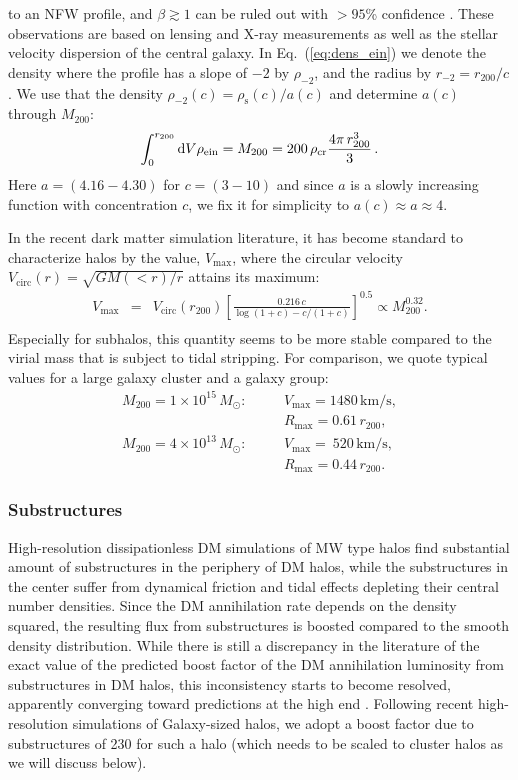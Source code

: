\documentclass[10pt,aps,pra,reprint,amsmath,amsfonts,amssymb,showpacs,nofootinbib,floatfix]{revtex4-1}
\newcommand{\rmn}{\mathrm}
\newcommand{\msun}{M_\odot}
\newcommand{\s}{\rmn{s}}
\newcommand{\dd}{\rmn{d}}
\newcommand{\rvir}{r_{200}}
\newcommand{\mvir}{M_{200}}
\begin{document}
to an NFW profile, and $\beta\gtrsim 1$ can be ruled out with $>95$\%
confidence \cite{2011ApJ...728L..39N}. These observations are based on
lensing and X-ray measurements as well as the stellar velocity
dispersion of the central galaxy. In Eq.~(\ref{eq:dens_ein}) we denote
the density where the profile has a slope of $-2$ by $\rho_{-2}$, and
the radius by $r_{-2}=\rvir/c$. We use that the density
$\rho_{-2}(c)=\rho_\s(c)/a(c)$ and determine $a(c)$ through $\mvir$:
\begin{equation}
\int_0^{\rvir}\dd V \rho_{\rm ein} = \mvir =
200\,\rho_{\rmn{cr}} \frac{4\pi\,\rvir^3}{3} \,.
\end{equation}
Here $a=(4.16-4.30)$ for $c=(3-10)$ and since $a$ is a slowly
increasing function with concentration $c$, we fix it for simplicity
to $a(c)\approx a \approx 4$.

In the recent dark matter simulation literature, it has become
standard to characterize halos by the value, $V_\rmn{max}$, where the
circular velocity $V_\rmn{circ}(r)=\sqrt{GM(<r)/r}$ attains its
maximum:
\begin{eqnarray}
V_\rmn{max} &=& V_\rmn{circ}(\rvir)
\left[\frac{0.216\,c}{\log(1+c)-c/(1+c)}\right]^{0.5}\propto \mvir^{0.32}.\nonumber\\
\end{eqnarray}
Especially for subhalos, this quantity seems to be more stable
compared to the virial mass that is subject to tidal stripping. For
comparison, we quote typical values for a large galaxy cluster and a galaxy group:
\begin{eqnarray}
M_{200} = 1\times10^{15}\,\msun:\quad &&V_\rmn{max}=1480\,\rmn{km/s}, \nonumber\\
                                     &&R_\rmn{max}=0.61\,\rvir, \\
M_{200} = 4\times10^{13}\,\msun:\quad &&V_\rmn{max}=~520\,\rmn{km/s}, \nonumber\\
                                     &&R_\rmn{max}=0.44\,\rvir.
\end{eqnarray}


\subsubsection{Substructures}
\label{sect:subst}
High-resolution dissipationless DM simulations of MW type halos find
substantial amount of substructures in the periphery of DM halos,
while the substructures in the center suffer from dynamical friction
and tidal effects depleting their central number densities. Since the
DM annihilation rate depends on the density squared, the resulting
flux from substructures is boosted compared to the smooth density
distribution. While there is still a discrepancy in the literature of
the exact value of the predicted boost factor of the DM annihilation
luminosity from substructures in DM halos, this inconsistency starts
to become resolved, apparently converging toward predictions at the
high end \protect \cite{2008MNRAS.391.1685S, 2008Natur.456...73S,
  2010ApJ...718..899A}. Following recent high-resolution simulations
of Galaxy-sized halos, we adopt a boost factor due to substructures of
230 for such a halo \cite{2008MNRAS.391.1685S} (which needs to be
scaled to cluster halos as we will discuss below).
\end{document}
